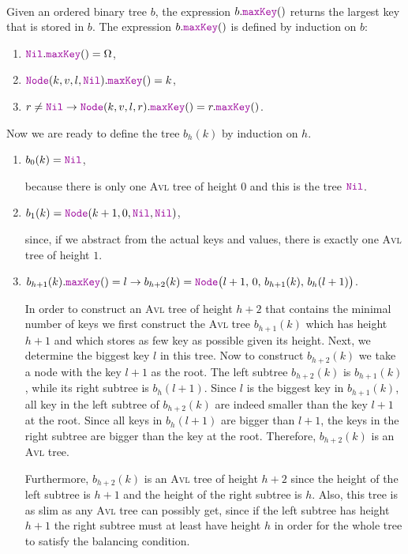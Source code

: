 \\[0.2cm]
Given an ordered binary tree  $b$, the expression $b.\mytt{maxKey}()$ returns the largest
key that is stored in $b$.  The expression  $b.\mytt{maxKey}()$ is defined by induction on $b$:
\begin{enumerate}
\item $\mytt{Nil}.\mytt{maxKey}() = \Omega$,
\item $\mytt{Node}(k,v,l,\mytt{Nil}).\mytt{maxKey}() = k$,
\item $r \not= \mytt{Nil} \rightarrow \mytt{Node}(k,v,l,r).\mytt{maxKey}() = r.\mytt{maxKey}()$.
\end{enumerate}
Now we are ready to define the tree $b_h(k)$ by induction on  $h$.
\begin{enumerate}
\item $b_0(k) = \mytt{Nil}$,

      because there is only one \textsc{Avl} tree of height $0$ and this is the tree $\mytt{Nil}$.
\item $b_1(k) = \mytt{Node}(k+1,0,\mytt{Nil}, \mytt{Nil})$,

      since, if we abstract from the actual keys and values, there is exactly one \textsc{Avl} tree of height
      $1$.
\item $b_{h+1}(k).\mytt{maxKey}() = l \rightarrow 
       b_{h+2}(k) = \mytt{Node}\bigl(l+1,\,0,\,b_{h+1}(k),\,b_h(l+1)\bigr)$.

      In order to construct an \textsc{Avl} tree of height $h+2$ that contains the minimal number of keys 
      we first construct the \textsc{Avl} tree $b_{h+1}(k)$ which has height  $h+1$ and which stores as few
      key as possible given its height.  Next, we determine the biggest key $l$ in this tree. 
      Now to construct $b_{h+2}(k)$ we take a node with the key $l+1$ as the root.
      The left subtree $b_{h+2}(k)$ is $b_{h+1}(k)$, while its right subtree is $b_h(l+1)$.
      Since $l$ is the biggest key in $b_{h+1}(k)$, all key in the left subtree of
      $b_{h+2}(k)$ are indeed smaller than the key $l+1$ at the root.  Since all keys in
      $b_h(l+1)$ are bigger than $l+1$, the keys in the right subtree are bigger than the key at the
      root.  Therefore, $b_{h+2}(k)$ is an \textsc{Avl} tree.

      Furthermore, $b_{h+2}(k)$ is an \textsc{Avl} tree of height $h+2$ since the height of the left subtree
      is $h+1$ and the height of the right subtree is $h$.  Also, this tree is as slim as
      any \textsc{Avl} tree can possibly get, since if the left subtree has height $h+1$ the right subtree
      must at least have height $h$ in order for the whole tree to satisfy the balancing condition.
\end{enumerate}
